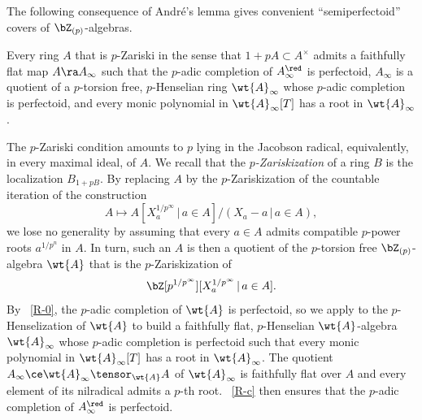 

The following consequence of Andr\'{e}'s lemma gives convenient ``semiperfectoid'' covers of $\bZ_{(p)}$-algebras.

\bcor \label{cor:semiperfectoid-cover}
Every ring $A$ that is $p$-Zariski in the sense that $1 + pA \subset A^\times$ admits a faithfully flat map $A \ra A_\infty$ such that the $p$-adic completion of $A_\infty^\red$ is perfectoid, $A_\infty$ is a quotient of a $p$-torsion free, $p$-Henselian ring $\wt{A}_\infty$ whose $p$-adic completion is perfectoid, and every monic polynomial in $\wt{A}_\infty[T]$ has a root in $\wt{A}_\infty$ .
\ecor

\bpf
The $p$-Zariski condition amounts to $p$ lying in the Jacobson radical, equivalently, in every maximal ideal, of $A$. We recall that the \emph{$p$-Zariskization} of a ring $B$ is the localization $B_{1 + pB}$. By replacing $A$ by the $p$-Zariskization of the countable iteration of the construction
\[
A \mapsto A[X_a^{1/p^\infty}\, \vert\, a \in A]/(X_a - a \, \vert \, a \in A),
\]
we lose no generality by assuming that every $a\in A$ admits compatible $p$-power roots $a^{1/p^n}$ in $A$. In turn, such an $A$ is then a quotient of the $p$-torsion free $\bZ_{(p)}$-algebra $\wt{A}$ that is the $p$-Zariskization of
\[
\bZ[p^{1/p^\infty}][X_a^{1/p^{\infty}}\, \vert\, a \in A].
\]
By ~\ref{R-0}, the $p$-adic completion of $\wt{A}$ is perfectoid, so we apply  to the $p$-Henselization of $\wt{A}$ to build a faithfully flat, $p$-Henselian $\wt{A}$-algebra $\wt{A}_\infty$ whose $p$-adic completion is perfectoid such that every monic polynomial in $\wt{A}_\infty[T]$ has a root in $\wt{A}_\infty$. The quotient $A_\infty \ce \wt{A}_\infty \tensor_{\wt{A}} A$ of $\wt{A}_\infty$ is faithfully flat over $A$ and every element of its nilradical admits a $p$-th root. ~\ref{R-c} then ensures that the $p$-adic completion of $A_\infty^\red$ is perfectoid.
\epf














